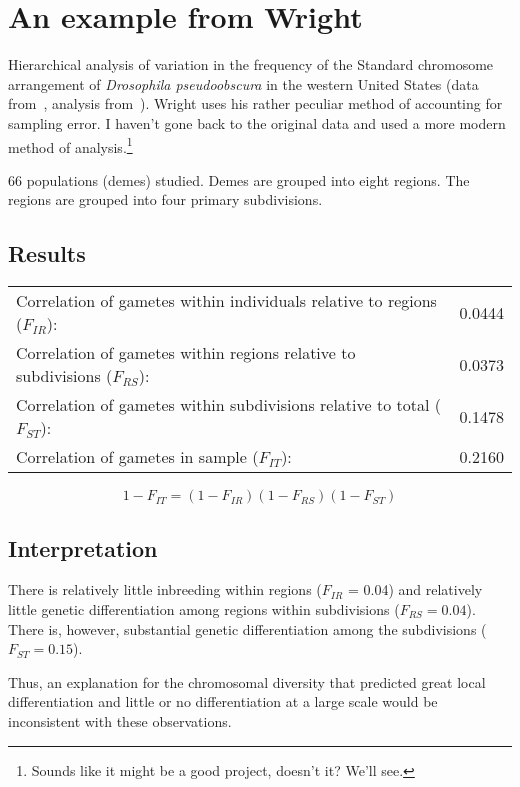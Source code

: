\section*{An example from Wright}

Hierarchical analysis of variation in the frequency of the Standard
chromosome arrangement of {\it Drosophila pseudoobscura\/} in the
western United States (data from~\cite{Dobzhansky-Epling-1944},
analysis from~\cite{Wright-1978}). Wright uses his rather peculiar method
of accounting for sampling error. I haven't gone back to the original
data and used a more modern method of analysis.\footnote{Sounds like
  it might be a good project, doesn't it? We'll see.}

66 populations (demes) studied.  Demes are grouped into eight regions.
The regions are grouped into four primary subdivisions.

\subsection*{Results}

\begin{center}
\begin{tabular}{lc}
Correlation of gametes within individuals relative to regions ($F_{IR}$): & 0.0444 \\
Correlation of gametes within regions relative to subdivisions ($F_{RS}$): & 0.0373 \\
Correlation of gametes within subdivisions relative to total ($F_{ST}$): & 0.1478 \\
Correlation of gametes in sample ($F_{IT}$): & 0.2160
\end{tabular}
\end{center}

\[
1 - F_{IT} = (1 - F_{IR})(1 - F_{RS})(1 - F_{ST})
\]

\subsection*{Interpretation}

There is relatively little inbreeding within regions ($F_{IR}$ = 0.04)
and relatively little genetic differentiation among regions within
subdivisions ($F_{RS} = 0.04$). There is, however, substantial genetic
differentiation among the subdivisions ($F_{ST} = 0.15$).

Thus, an explanation for the chromosomal diversity that predicted
great local differentiation and little or no differentiation at a
large scale would be inconsistent with these observations.

